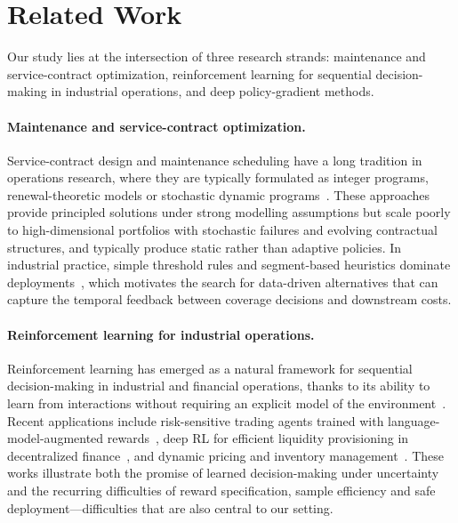 \section{Related Work}
\label{sec:related_work}

Our study lies at the intersection of three research strands: maintenance and service-contract optimization, reinforcement learning for sequential decision-making in industrial operations, and deep policy-gradient methods.


\paragraph{Maintenance and service-contract optimization.}
Service-contract design and maintenance scheduling have a long tradition in operations research, where they are typically formulated as integer programs, renewal-theoretic models or stochastic dynamic programs~\cite{jardine2006managing, dekker1996applications}. These approaches provide principled solutions under strong modelling assumptions but scale poorly to high-dimensional portfolios with stochastic failures and evolving contractual structures, and typically produce static rather than adaptive policies. In industrial practice, simple threshold rules and segment-based heuristics dominate deployments~\cite{gits1992structuring}, which motivates the search for data-driven alternatives that can capture the temporal feedback between coverage decisions and downstream costs.


\paragraph{Reinforcement learning for industrial operations.}
Reinforcement learning has emerged as a natural framework for sequential decision-making in industrial and financial operations, thanks to its ability to learn from interactions without requiring an explicit model of the environment~\cite{sutton2018reinforcement}. Recent applications include risk-sensitive trading agents trained with language-model-augmented rewards~\cite{benhenda2025}, deep RL for efficient liquidity provisioning in decentralized finance~\cite{xu2025}, and dynamic pricing and inventory management~\cite{boute2022deep}. These works illustrate both the promise of learned decision-making under uncertainty and the recurring difficulties of reward specification, sample efficiency and safe deployment---difficulties that are also central to our setting.



